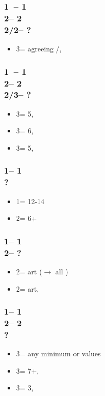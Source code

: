 \documentclass[12pt, a4paper]{article}
\begin{document}
\subsubsection*{1\clubs\ -- 1\spades \\ 
                2\clubs -- 2\diams\\
                2\hearts/2\spades -- ?}
\begin{itemize}
    \item 3\diams = agreeing \hearts/\spades, \gf
\end{itemize}

\subsubsection*{1\clubs\ -- 1\spades \\ 
                2\clubs -- 2\diams\\
                2\nt/3\clubs -- ?}
\begin{itemize}
    \item 3\hearts = 5\hearts, \gf
    \item 3\spades = 6\hearts, \gf
    \item 3\nt = 5\hearts, \gf
\end{itemize}

\subsubsection*{1\diams -- 1\hearts\\ ?}
\begin{itemize}
    \item 1\nt = 12-14 \bal
    \item 2\diams = 6+\diams
\end{itemize}

\subsubsection*{1\diams -- 1\hearts\\
                2\diams -- ?}
\begin{itemize}
    \item 2\spades = \gf art ($\rightarrow$ all \nat) \vimp
    \item 2\nt = \inv art, \fton{3\diams} \vimp
\end{itemize}

\subsubsection*{1\diams -- 1\hearts\\
                2\diams -- 2\nt \\ ?}
\begin{itemize}
    \item 3\clubs = any minimum or \clubs values
    \item 3\diams = 7+\diams, \gf
    \item 3\hearts = 3\hearts, \gf
\end{itemize}
\end{document}
